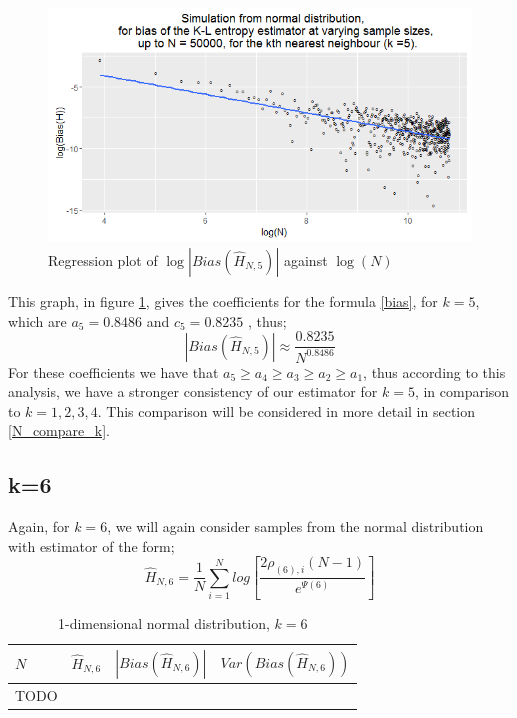 \documentclass{report}
\begin{document}
\begin{figure}
  \begin{center}
    \includegraphics[width=\textwidth]{./Graphs/Normal_k=5_plot.png}
  \end{center} 
\caption{Regression plot of $\log|Bias(\hat{H}_{N, 5})|$ against $\log(N)$}
  \label{normal_k=5_graph}
\end{figure}

This graph, in figure \ref{normal_k=5_graph}, gives the coefficients for the formula \ref{bias}, for $k=5$, which are $a_{5} = 0.8486$ and $c_{5} = 0.8235$ , thus;
\begin{equation}
|Bias(\hat{H}_{N, 5})| \approx \frac{0.8235}{N^{0.8486}} \nonumber
\end{equation}
For these coefficients we have that $a_{5} \geq a_{4} \geq a_{3} \geq a_{2} \geq a_{1}$, thus according to this analysis, we have a stronger consistency of our estimator for $k=5$, in comparison to $k=1, 2, 3, 4$. This comparison will be considered in more detail in section \ref{N_compare_k}.



\subsection{k=6} \label{N_k=6}
Again, for $k=6$, we will again consider samples from the normal distribution with estimator of the form;
\begin{equation}
\hat{H}_{N, 6} = \frac{1}{N} \sum_{i=1}^{N} log \left[ \frac{2\rho_{(6),i} (N-1)}{e^{\Psi(6)}} \right] \nonumber
\end{equation}

\begin{table}
\caption{1-dimensional normal distribution, $k=6$} \label{normal_k=6_table}
\begin{center}
\begin{tabular}{| l | c c c|} 
\toprule
$N$ & $\hat{H}_{N, 6}$ & $|Bias(\hat{H}_{N, 6})|$ & $Var(Bias(\hat{H}_{N, 6}))$ \\
\midrule[1pt]
TODO & & & \\
\hline
\end{tabular}
\end{center}
\end{table}
\end{document}
